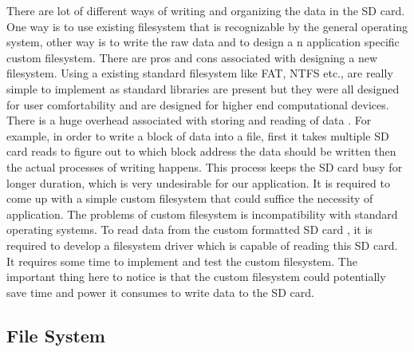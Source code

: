 There are lot of different ways of writing and organizing the data in the SD card. One way is to use existing filesystem that is recognizable by the general operating system, other way is to write the raw data and to design a n application specific custom filesystem. There are pros and cons associated with designing a new filesystem. Using a existing standard filesystem like FAT, NTFS etc., are really simple to implement as standard libraries are present but they were all designed for user comfortability and are designed for higher end computational devices. There is a huge overhead associated with storing and reading of data . For example, in order to write a block of data into a file, first it takes multiple SD card reads to figure out to which block address the data should be written then the actual processes of writing happens. This process keeps the SD card busy for longer duration, which is very undesirable for our application. It is required to come up with a simple custom filesystem that could suffice the necessity of application. The problems of custom filesystem is incompatibility with standard operating systems. To read data from the custom formatted SD card , it is required to develop a filesystem driver which is capable of reading this SD card. It requires some time to implement and test the custom filesystem. The important thing here to notice is that the custom filesystem could potentially save time and power it consumes to write data to the SD card.


\subsection{File System}\label{filesystem}

 


